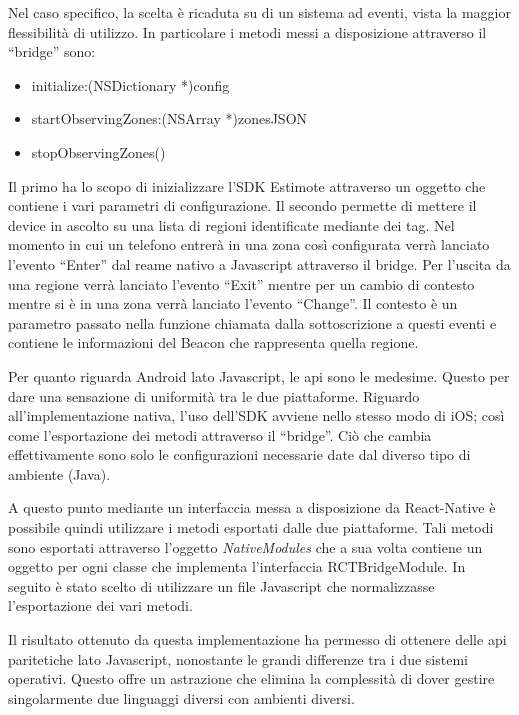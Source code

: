 Nel caso specifico, la scelta è ricaduta su di un sistema ad eventi, vista la maggior flessibilità di utilizzo. In particolare i metodi messi a disposizione attraverso il “bridge” sono:\vspace{5mm}

\begin{itemize}
	\item initialize:(NSDictionary *)config
	\item startObservingZones:(NSArray *)zonesJSON
	\item stopObservingZones()
\end{itemize}\vspace{5mm}
	
Il primo ha lo scopo di inizializzare l'SDK Estimote attraverso un oggetto che contiene i vari parametri di configurazione. Il secondo permette di mettere il device in ascolto su una lista di regioni identificate mediante dei tag. Nel momento in cui un telefono entrerà in una zona così configurata verrà lanciato l’evento “Enter” dal reame nativo a Javascript attraverso il bridge. Per l’uscita da una regione verrà lanciato l’evento “Exit” mentre per un cambio di contesto mentre si è in una zona verrà lanciato l'evento “Change”. Il contesto è un parametro passato nella funzione chiamata dalla sottoscrizione a questi eventi e contiene le informazioni del Beacon che rappresenta quella regione.\vspace{5mm}

Per quanto riguarda Android lato Javascript, le api sono le medesime. Questo per dare una sensazione di uniformità tra le due piattaforme. Riguardo all’implementazione nativa, l'uso dell’SDK avviene nello stesso modo di iOS; così come l’esportazione dei metodi attraverso il “bridge”. Ciò che cambia effettivamente sono solo le configurazioni necessarie date dal diverso tipo di ambiente (Java).\vspace{5mm}

A questo punto mediante un interfaccia messa a disposizione da React-Native è possibile quindi utilizzare i metodi esportati dalle due piattaforme. Tali metodi sono esportati attraverso l’oggetto \emph{NativeModules} che a sua volta contiene un oggetto per ogni classe che implementa l’interfaccia RCTBridgeModule. In seguito è stato scelto di utilizzare un file Javascript che normalizzasse l’esportazione dei vari metodi.\vspace{5mm}

Il risultato ottenuto da questa implementazione ha permesso di ottenere delle api paritetiche lato Javascript, nonostante le grandi differenze tra i due sistemi operativi. Questo offre un astrazione che elimina la complessità di dover gestire singolarmente due linguaggi diversi con ambienti diversi. \vspace{5mm}

